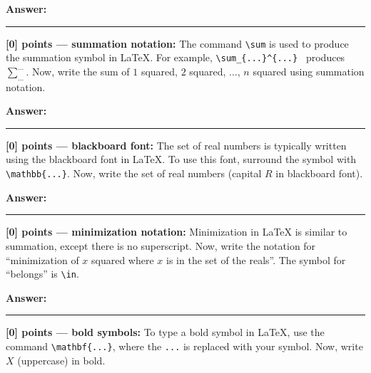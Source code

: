 \documentclass{article}
\newcommand{\mydivider}{\vspace{1em}\hrule\vspace{1em}}
\begin{document}
\begin{tcolorbox}{}
\textbf{Answer: }


\end{tcolorbox}


\mydivider

\noindent\textbf{[0] points --- summation notation:} The command \verb|\sum| is used to produce the summation symbol in LaTeX. For example, \verb|\sum_{...}^{...} | produces $\sum_{...}^{...}$. Now, write the sum of $1$ squared, $2$ squared, $\ldots$, $n$ squared using summation notation.

\begin{tcolorbox}{}
\textbf{Answer: }


\end{tcolorbox}

\mydivider


\noindent\textbf{[0] points --- blackboard font:} The set of real numbers is typically written using the blackboard font in LaTeX. To use this font, surround the symbol with \verb|\mathbb{...}|. Now, write the set of real numbers (capital $R$ in blackboard font).

\begin{tcolorbox}{}
\textbf{Answer: }


\end{tcolorbox}

\mydivider

\noindent\textbf{[0] points --- minimization notation:} Minimization in LaTeX is similar to summation, except there is no superscript. Now, write the notation for ``minimization of $x$ squared where $x$ is in the set of the reals''. The symbol for ``belongs'' is \verb|\in|.

\begin{tcolorbox}{}
\textbf{Answer: }


\end{tcolorbox}

\mydivider

\noindent\textbf{[0] points --- bold symbols:} To type a bold symbol in LaTeX, use the command \verb|\mathbf{...}|, where the \verb|...| is replaced with your symbol.  Now, write $X$  (uppercase) in bold.
\end{document}
